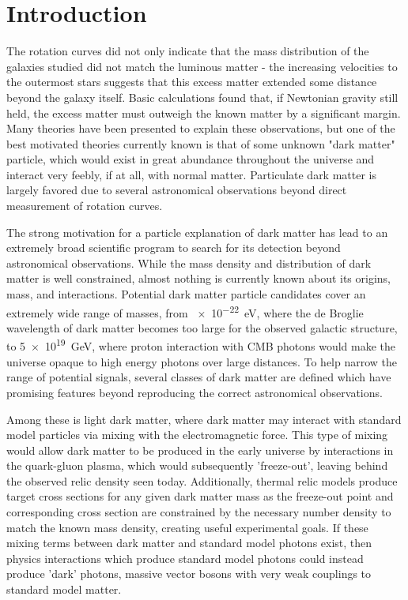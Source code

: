 \chapter{Introduction}
\label{intro_chapter}

The rotation curves did not only indicate that the mass distribution of the galaxies studied did not match the luminous matter - the increasing velocities to the outermost stars suggests that this excess matter extended some distance beyond the galaxy itself. 
Basic calculations found that, if Newtonian gravity still held, the excess matter must outweigh the known matter by a significant margin. 
Many theories have been presented to explain these observations, but one of the best motivated theories currently known is that of some unknown "dark matter" particle, which would exist in great abundance throughout the universe and interact very feebly, if at all, with normal matter.
Particulate dark matter is largely favored due to several astronomical observations beyond direct measurement of rotation curves.


The strong motivation for a particle explanation of dark matter has lead to an extremely broad scientific program to search for its detection beyond astronomical observations. 
While the mass density and distribution of dark matter is well constrained, almost nothing is currently known about its origins, mass, and interactions.
Potential dark matter particle candidates cover an extremely wide range of masses, from \SI{e-22}{\eV}, where the de Broglie wavelength of dark matter becomes too large for the observed galactic structure, to \SI{5e19}{\giga\eV}, where proton interaction with CMB photons would make the universe opaque to high energy photons over large distances.
To help narrow the range of potential signals, several classes of dark matter are defined which have promising features beyond reproducing the correct astronomical observations. 

Among these is light dark matter, where dark matter may interact with standard model particles via mixing with the electromagnetic force. 
This type of mixing would allow dark matter to be produced in the early universe by interactions in the quark-gluon plasma, which would subsequently 'freeze-out', leaving behind the observed relic density seen today. 
Additionally, thermal relic models produce target cross sections for any given dark matter mass as the freeze-out point and corresponding cross section are constrained by the necessary number density to match the known mass density, creating useful experimental goals.
If these mixing terms between dark matter and standard model photons exist, then physics interactions which produce standard model photons could instead produce 'dark' photons, massive vector bosons with very weak couplings to standard model matter.

